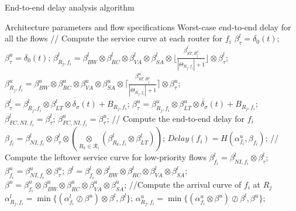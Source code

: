 \documentclass[preprint]{elsarticle}
\begin{document}
\begin{algorithm}
\caption{End-to-end delay analysis algorithm}
\label{alg:equivalentservicecurve}
\begin{algorithmic}[1]
\Require Architecture parameters and flow specifications
\Ensure Worst-case end-to-end delay for all the flows
        \State // Compute the service curve at each router for $f_i$
        \State $\beta_{\tau}^l=\delta_0(t)$;
        \State $\beta_{\tau}^u=\delta_0(t)$;
            \State $\beta_{R_j,f_i}^l=\beta_{BW}^l\otimes\beta_{RC}^l\otimes\beta_{VA}^l\otimes\beta_{SA}^l\otimes\lfloor\frac{\beta_{ST,R_j^{p}}^{l^\prime}}{|\Theta_{R_j,f_i}|+1}\rfloor\otimes\beta_{\tau}^l$;
            \State $\beta_{R_j,f_i}^u=\beta_{BW}^u\otimes\beta_{RC}^u\otimes\beta_{VA}^u\otimes\beta_{SA}^u\otimes\lceil\frac{\beta_{ST,R_j^{p}}^{u^\prime}}{|\Theta_{R_j,f_i}|+1}\rceil\otimes\beta_{\tau}^u$;
            \State $\beta_{\tau}^l=\overline{\beta^l_{R_j,f_i}\otimes\beta_{LT}^l\otimes\delta_\sigma(t)+B_{R_j,f_i}}$;
            \State $\beta_{\tau}^u=\overline{\beta^u_{R_j,f_i}\otimes\beta_{LT}^u\otimes\delta_\sigma(t)+B_{R_j,f_i}}$;
        \EndFor
        \State $\beta_{FC,NI,f_i}^l=\beta^l_{\tau}$;
        \State $\beta_{FC,NI,f_i}^u=\beta^u_{\tau}$;
        \State // Compute the end-to-end delay for $f_i$
        \State $\beta_{f_i}=\beta_{NI,f_i}^l\otimes\beta^l_{\tau}\otimes (\underset{R_k\in\mathcal{R}_{i}}{\otimes}(\beta^l_{R_k,f_i}\otimes\beta^l_{LT}))$;
        \State $Delay(f_i)=H(\alpha^u_{f_i},\beta_{f_i})$;
        \State // Compute the leftover service curve for low-priority flows
        \State $\beta_{f_i}^l=\beta_{NI,f_i}^l\otimes\beta^l_{\tau}$;
        \State $\beta_{f_i}^u=\beta_{NI,f_i}^u\otimes\beta^u_{\tau}$;
                \State $\beta^l=\beta^l_{f_i}\otimes\beta_{BW}^l\otimes\beta_{RC}^l\otimes\beta_{VA}^l\otimes\beta_{SA}^l$;
                \State $\beta^u=\beta^u_{f_i}\otimes\beta_{BW}^u\otimes\beta_{RC}^u\otimes\beta_{VA}^u\otimes\beta_{SA}^u$;
                \State //Compute the arrival curve of $f_i$ at $R_j$
                \State $\alpha^l_{R_j,f_i}=\min\{(\alpha^l_{f_i}\oslash\beta^u)\otimes\beta^l,\beta^l\}$;
                \State $\alpha^u_{R_j,f_i}=\min\{(\alpha^u_{f_i}\otimes\beta^u)\oslash\beta^l,\beta^u\}$;

\end{algorithmic}
\end{algorithm}
\end{document}
